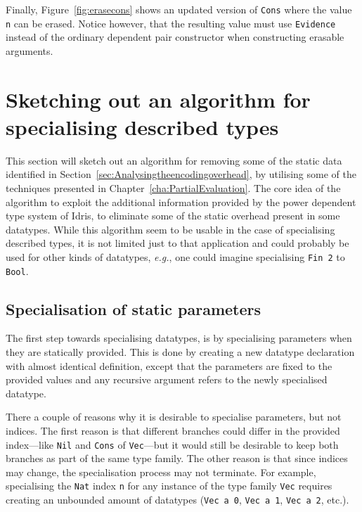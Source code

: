 \documentclass{ituthesis}
\newcommand{\ttconstructor}[1]{\textcolor{constructor-color}{\texttt{#1}}}
\newcommand{\tttype}[1]{\textcolor{type-color}{\texttt{#1}}}
\newcommand{\ttdec}[1]{\textcolor{declared-var-color}{\texttt{#1}}}
\newcommand{\ttvar}[1]{\textcolor{local-var-color}{\texttt{#1}}}
\newcommand{\ttliteral}[1]{\textcolor{literal-color}{\texttt{#1}}}
\theoremstyle{break}
\begin{document}
Finally, Figure~\ref{fig:erasecons} shows an updated version of \ttdec{Cons} where the value \ttvar{n} can be erased.
Notice however, that the resulting value must use \ttconstructor{Evidence} instead of the ordinary dependent pair constructor when constructing erasable arguments.

\section{Sketching out an algorithm for specialising described types}
\label{sec:Sketchingoutanalgorithmforspecialisingdescribedtypes}
This section will sketch out an algorithm for removing some of the static data identified in Section~\ref{sec:Analysingtheencodingoverhead},
by utilising some of the techniques presented in Chapter~\ref{cha:PartialEvaluation}.
The core idea of the algorithm to exploit the additional information provided by the power dependent type system of Idris,
to eliminate some of the static overhead present in some datatypes.
While this algorithm seem to be usable in the case of specialising described types, it is not limited just to that application and could probably be used for other kinds of datatypes, \textit{e.g.},
one could imagine specialising \tttype{Fin}~\ttliteral{2} to \tttype{Bool}.

\subsection{Specialisation of static parameters}
\label{sub:Specialisationofstaticparameters}
The first step towards specialising datatypes, is by specialising parameters when they are statically provided.
This is done by creating a new datatype declaration with almost identical definition, except that the parameters are fixed to the provided values
and any recursive argument refers to the newly specialised datatype.

There a couple of reasons why it is desirable to specialise parameters, but not indices.
The first reason is that different branches could differ in the provided index---like \ttconstructor{Nil} and \ttconstructor{Cons} of \tttype{Vec}---but it would still be desirable to keep both branches as part of the same type family.
The other reason is that since indices may change, the specialisation process may not terminate.
For example, specialising the \tttype{Nat} index \ttvar{n} for any instance of the type family \tttype{Vec} requires creating an unbounded amount of datatypes (\tttype{Vec}~\ttvar{a}~\ttliteral{0}, \tttype{Vec}~\ttvar{a}~\ttliteral{1}, \tttype{Vec}~\ttvar{a}~\ttliteral{2}, etc.).
\end{document}
